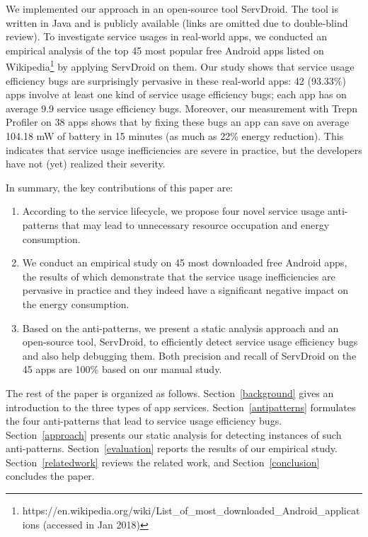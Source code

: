 \documentclass[conference]{IEEEtran}
\begin{document}
We implemented our approach in an open-source tool \textsf{ServDroid}. The tool
is written in Java and is publicly available (links are omitted due to double-blind review).
To investigate service usages in real-world apps, we
conducted an empirical analysis of the top 45 most popular free Android apps
listed on Wikipedia\footnote{https://en.wikipedia.org/wiki/List\_of\_most\_downloaded\_Android\_applications
(accessed in Jan 2018)} by applying \textsf{ServDroid} on them.
Our study shows that
service usage efficiency bugs are surprisingly pervasive in these real-world
apps: 42 (93.33\%) apps involve at least one kind of service usage efficiency
bugs; each app has on average 9.9 service usage efficiency bugs.
Moreover, our measurement with \textsf{Trepn Profiler} on 38 apps shows that by fixing these bugs an
app can save on average 104.18 mW of battery in 15 minutes (as much as 22\%
energy reduction).
This indicates that service usage inefficiencies are
severe in practice, but the developers have not (yet) realized their severity.


In summary, the key contributions of this paper are:
\begin{enumerate}
\item According to the service lifecycle, we propose four novel service usage
anti-patterns that may lead to unnecessary resource occupation and energy
consumption.
\item We conduct an empirical study on 45 most downloaded free Android apps, the
results of which demonstrate that the service usage inefficiencies are pervasive
in practice and they indeed have a significant negative impact on the energy consumption.
\item Based on the anti-patterns, we present a static analysis approach and an
open-source tool, \textsf{ServDroid}, to efficiently detect service usage
efficiency bugs and also help debugging them. Both precision and recall of
\textsf{ServDroid} on the 45 apps are 100\% based on our manual study.
\end{enumerate}

The rest of the paper is organized as follows. Section~\ref{background} gives an
introduction to the three types of app services.
Section~\ref{antipatterns} formulates the four anti-patterns that lead to
service usage efficiency bugs.
Section~\ref{approach} presents our static analysis for detecting instances
of such anti-patterns.
Section~\ref{evaluation} reports the results of our empirical study.
Section~\ref{relatedwork} reviews the related work, and
Section~\ref{conclusion} concludes the paper.
\end{document}
